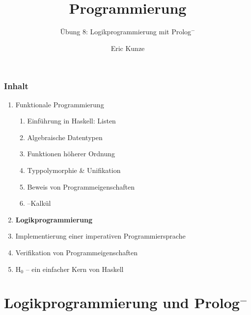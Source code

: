 \documentclass{beamer}
\begin{document}
	
	\title{Programmierung}
	\subtitle{Übung 8: Logikprogrammierung mit Prolog${}^-$}
	\author{Eric Kunze}
	\date{}
	
	\maketitle
	


\begin{frame}[fragile] \frametitle{Inhalt}
	\begin{enumerate}
		\item Funktionale Programmierung
		\begin{enumerate}
			\item Einführung in Haskell: Listen
			\item Algebraische Datentypen
			\item Funktionen höherer Ordnung
			\item Typpolymorphie \& Unifikation
			\item Beweis von Programmeigenschaften
			\item \textlambda--Kalkül
		\end{enumerate}
		\item \textbf{Logikprogrammierung}
		\item Implementierung einer imperativen Programmiersprache
		\item Verifikation von Programmeigenschaften
		\item H${}_\text{0}$ -- ein einfacher Kern von Haskell
	\end{enumerate}
\end{frame}


\section{Logikprogrammierung und Prolog${}^-$}
\end{document}

